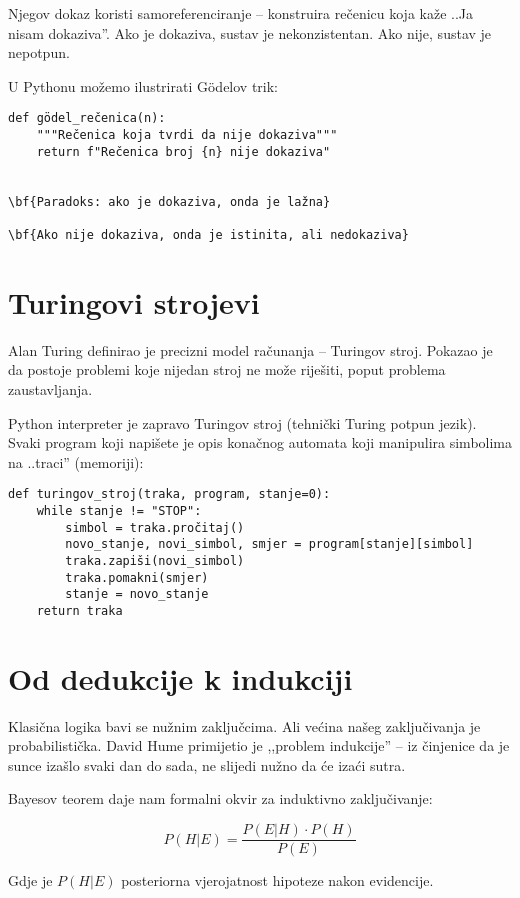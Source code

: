 Njegov dokaz koristi samoreferenciranje -- konstruira rečenicu koja kaže ..Ja nisam dokaziva''. Ako je dokaziva, sustav je nekonzistentan. Ako nije, sustav je nepotpun.


U Pythonu možemo ilustrirati Gödelov trik:
\begin{verbatim}
def gödel_rečenica(n):
    """Rečenica koja tvrdi da nije dokaziva"""
    return f"Rečenica broj {n} nije dokaziva"


\bf{Paradoks: ako je dokaziva, onda je lažna}

\bf{Ako nije dokaziva, onda je istinita, ali nedokaziva}

\end{verbatim}


\section{Turingovi strojevi}


Alan Turing definirao je precizni model računanja -- Turingov stroj. Pokazao je da postoje problemi koje nijedan stroj ne može riješiti, poput problema zaustavljanja.


Python interpreter je zapravo Turingov stroj (tehnički Turing potpun jezik).
Svaki program koji napišete je opis konačnog automata koji manipulira simbolima na ..traci'' (memoriji):

\begin{verbatim}
def turingov_stroj(traka, program, stanje=0):
    while stanje != "STOP":
        simbol = traka.pročitaj()
        novo_stanje, novi_simbol, smjer = program[stanje][simbol]
        traka.zapiši(novi_simbol)
        traka.pomakni(smjer)
        stanje = novo_stanje
    return traka
\end{verbatim}


\section{Od dedukcije k indukciji}

Klasična logika bavi se nužnim zaključcima. Ali većina našeg zaključivanja je probabilistička. David Hume primijetio je ,,problem indukcije'' -- iz činjenice da je sunce izašlo svaki dan do sada, ne slijedi nužno da će izaći sutra.

Bayesov teorem daje nam formalni okvir za induktivno zaključivanje:

$$P(H|E) = \frac{P(E|H) \cdot P(H)}{P(E)}$$


Gdje je $P(H|E)$ posteriorna vjerojatnost hipoteze nakon evidencije.


